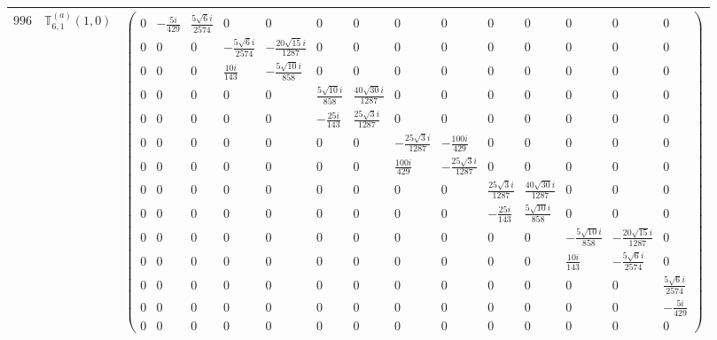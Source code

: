 \documentclass[fleqn,8pt,landscape]{jsarticle}
\begin{document}
\begin{center}
\begin{longtable}{ccc}
$ 996 $ & $ \mathbb{T}_{6,1}^{(a)}(1,0) $ & $ \begin{pmatrix} 0 & - \frac{5 i}{429} & \frac{5 \sqrt{6} i}{2574} & 0 & 0 & 0 & 0 & 0 & 0 & 0 & 0 & 0 & 0 & 0 \\ 0 & 0 & 0 & - \frac{5 \sqrt{6} i}{2574} & - \frac{20 \sqrt{15} i}{1287} & 0 & 0 & 0 & 0 & 0 & 0 & 0 & 0 & 0 \\ 0 & 0 & 0 & \frac{10 i}{143} & - \frac{5 \sqrt{10} i}{858} & 0 & 0 & 0 & 0 & 0 & 0 & 0 & 0 & 0 \\ 0 & 0 & 0 & 0 & 0 & \frac{5 \sqrt{10} i}{858} & \frac{40 \sqrt{30} i}{1287} & 0 & 0 & 0 & 0 & 0 & 0 & 0 \\ 0 & 0 & 0 & 0 & 0 & - \frac{25 i}{143} & \frac{25 \sqrt{3} i}{1287} & 0 & 0 & 0 & 0 & 0 & 0 & 0 \\ 0 & 0 & 0 & 0 & 0 & 0 & 0 & - \frac{25 \sqrt{3} i}{1287} & - \frac{100 i}{429} & 0 & 0 & 0 & 0 & 0 \\ 0 & 0 & 0 & 0 & 0 & 0 & 0 & \frac{100 i}{429} & - \frac{25 \sqrt{3} i}{1287} & 0 & 0 & 0 & 0 & 0 \\ 0 & 0 & 0 & 0 & 0 & 0 & 0 & 0 & 0 & \frac{25 \sqrt{3} i}{1287} & \frac{40 \sqrt{30} i}{1287} & 0 & 0 & 0 \\ 0 & 0 & 0 & 0 & 0 & 0 & 0 & 0 & 0 & - \frac{25 i}{143} & \frac{5 \sqrt{10} i}{858} & 0 & 0 & 0 \\ 0 & 0 & 0 & 0 & 0 & 0 & 0 & 0 & 0 & 0 & 0 & - \frac{5 \sqrt{10} i}{858} & - \frac{20 \sqrt{15} i}{1287} & 0 \\ 0 & 0 & 0 & 0 & 0 & 0 & 0 & 0 & 0 & 0 & 0 & \frac{10 i}{143} & - \frac{5 \sqrt{6} i}{2574} & 0 \\ 0 & 0 & 0 & 0 & 0 & 0 & 0 & 0 & 0 & 0 & 0 & 0 & 0 & \frac{5 \sqrt{6} i}{2574} \\ 0 & 0 & 0 & 0 & 0 & 0 & 0 & 0 & 0 & 0 & 0 & 0 & 0 & - \frac{5 i}{429} \\ 0 & 0 & 0 & 0 & 0 & 0 & 0 & 0 & 0 & 0 & 0 & 0 & 0 & 0 \end{pmatrix} $ \\ \hline

\end{longtable}
\end{center}
\end{document}

